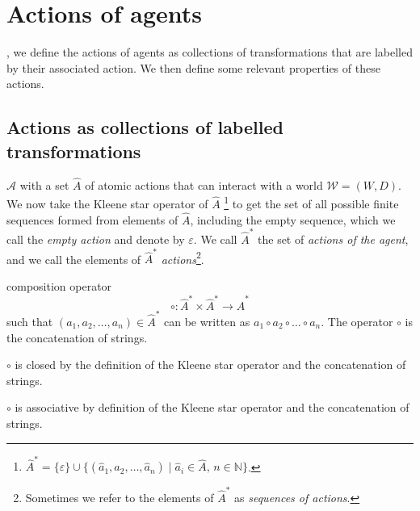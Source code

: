 \section{Actions of agents}


, we define the actions of agents as collections of transformations that are labelled by their associated action.
We then define some relevant properties of these actions.

\subsection{Actions as collections of labelled transformations}

 $\mathscr{A}$ with a set $\hat{A}$ of atomic actions that can interact with a world $\mathscr{W} = (W, D)$.
We now take the Kleene star operator of $\hat{A}$ \footnote{
	$\hat{A}^{*} = \{ \varepsilon \} \cup \{ (\hat{a}_1, \hat{a}_2, \dots, \hat{a}_n) \mid \hat{a}_i \in \hat{A}, \, n \in \mathbb{N} \}$.
} to get the set of all possible finite sequences formed from elements of $\hat{A}$, including the empty sequence, which we call the \emph{empty action} and denote by $\varepsilon$.
We call $\hat{A}^{*}$ the set of \emph{actions of the agent}, and we call the elements of $\hat{A}^{*}$ \emph{actions}\footnote{
Sometimes we refer to the elements of $\hat{A}^{*}$ as \emph{sequences of actions}.
}.

 composition operator
\begin{equation}
	\circ: \hat{A}^{*} \times \hat{A}^{*} \to \hat{A}^{*}
\end{equation}
such that $(a_1, a_2, \dots, a_n) \in \hat{A}^{*}$ can be written as $a_1 \circ a_2 \circ \dots \circ a_n$.
The operator $\circ$ is the concatenation of strings.

\begin{corollaryE}
    $\circ$ is closed by the definition of the Kleene star operator and the concatenation of strings.
\end{corollaryE}

\begin{corollaryE}\label{col:circ_associative}
    $\circ$ is associative by definition of the Kleene star operator and the concatenation of strings.
\end{corollaryE}

